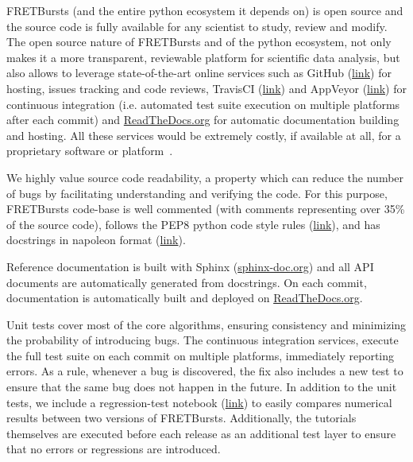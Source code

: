 FRETBursts (and the entire python ecosystem it depends on) is open source
and the source code is fully available for any scientist to study,
review and modify.
The open source nature of FRETBursts and of the python ecosystem,
not only makes it a more transparent, reviewable platform
for scientific data analysis, but also allows
to leverage state-of-the-art online services such as GitHub (\href{http://https://github.com}{link}) for hosting,
issues tracking and code reviews, TravisCI
(\href{https://travis-ci.org}{link}) and AppVeyor (\href{http://www.appveyor.com/}{link}) for continuous integration
(i.e. automated test suite execution on multiple platforms after each commit)
and \href{https://readthedocs.org/}{ReadTheDocs.org} for automatic documentation building and hosting.
All these services would be extremely costly, if available at all,
for a proprietary software or platform~\cite{Freeman_2015}.

We highly value source code readability, a property which can
reduce the number of bugs by facilitating understanding and verifying the code.
For this purpose, FRETBursts code-base is well commented (with comments representing over 35\%
of the source code),
follows the PEP8 python code style rules (\href{https://www.python.org/dev/peps/pep-0008/}{link}),
and has docstrings in napoleon format (\href{http://sphinxcontrib-napoleon.readthedocs.org/}{link}).

Reference documentation is built with Sphinx (\href{http://sphinx-doc.org/}{sphinx-doc.org})
and all API documents are automatically generated from docstrings.
On each commit, documentation is automatically built and deployed on
\href{https://readthedocs.org/}{ReadTheDocs.org}.

Unit tests cover most of the core algorithms, ensuring consistency and
minimizing the probability of introducing bugs.
The continuous integration services, execute the full test suite 
on each commit on multiple platforms, immediately reporting errors.
As a rule, whenever a bug is discovered, the  fix also includes a new test
to ensure that the same bug does not happen in the future.
In addition to the unit tests, we include a regression-test notebook
(\href{https://github.com/tritemio/FRETBursts/blob/master/notebooks/dev/tests/FRETBursts%20-%20Regression%20tests.ipynb}{link})
to easily compares numerical results between two versions of FRETBursts.
Additionally, the tutorials themselves are executed before each release as
an additional test layer to ensure that no errors or regressions are introduced.

